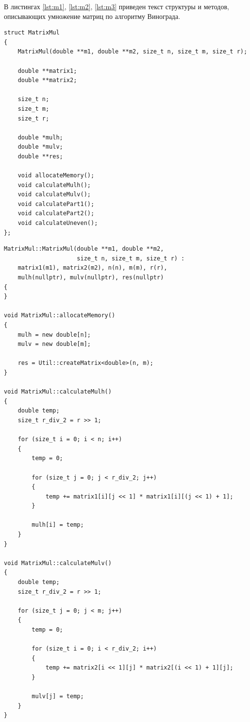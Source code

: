 В листингах \ref{lst:m1}, \ref{lst:m2}, \ref{lst:m3} приведен текст структуры и методов, описывающих умножение матриц по алгоритму Винограда.

\begin{lstlisting}[caption={Алгоритм Винограда, ч. 1}, label=lst:m1]
struct MatrixMul
{
    MatrixMul(double **m1, double **m2, size_t n, size_t m, size_t r);

    double **matrix1;
    double **matrix2;

    size_t n;
    size_t m;
    size_t r;

    double *mulh;
    double *mulv;
    double **res;

    void allocateMemory();
    void calculateMulh();
    void calculateMulv();
    void calculatePart1();
    void calculatePart2();
    void calculateUneven();
};
\end{lstlisting}

\begin{lstlisting}[caption={Алгоритм Винограда, ч. 2}, label=lst:m2]
MatrixMul::MatrixMul(double **m1, double **m2,
                     size_t n, size_t m, size_t r) :
    matrix1(m1), matrix2(m2), n(n), m(m), r(r),
    mulh(nullptr), mulv(nullptr), res(nullptr)
{
}

void MatrixMul::allocateMemory()
{
    mulh = new double[n];
    mulv = new double[m];

    res = Util::createMatrix<double>(n, m);
}

void MatrixMul::calculateMulh()
{
    double temp;
    size_t r_div_2 = r >> 1;

    for (size_t i = 0; i < n; i++)
    {
        temp = 0;

        for (size_t j = 0; j < r_div_2; j++)
        {
            temp += matrix1[i][j << 1] * matrix1[i][(j << 1) + 1];
        }

        mulh[i] = temp;
    }
}

void MatrixMul::calculateMulv()
{
    double temp;
    size_t r_div_2 = r >> 1;

    for (size_t j = 0; j < m; j++)
    {
        temp = 0;

        for (size_t i = 0; i < r_div_2; i++)
        {
            temp += matrix2[i << 1][j] * matrix2[(i << 1) + 1][j];
        }

        mulv[j] = temp;
    }
}
\end{lstlisting}


